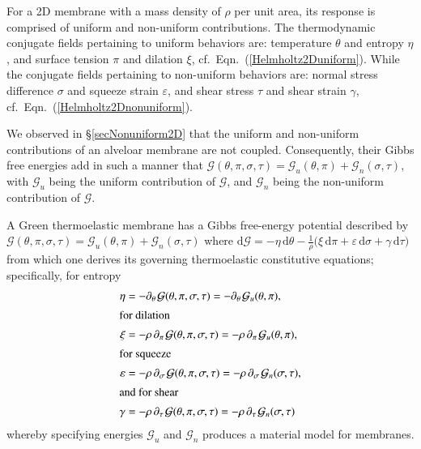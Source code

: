 For a 2D membrane with a mass density of $\rho$ per unit area, its response is comprised of uniform and non-uniform contributions.  The thermo\-dynamic conjugate fields pertaining to uniform behaviors are: temperature $\theta$ and entropy $\eta$, and surface tension $\pi$ and dilation $\xi$, cf.\ Eqn.~(\ref{Helmholtz2Duniform}).  While the conjugate fields pertaining to non-uniform behaviors are: normal stress difference $\sigma$ and squeeze strain $\varepsilon$, and shear stress $\tau$ and shear strain $\gamma$, cf.\ Eqn.~(\ref{Helmholtz2Dnonuniform}).

We observed in \S\ref{secNonuniform2D} that the uniform and non-uniform contributions of an alveloar membrane are not coupled.  Consequently, their Gibbs free energies add in such a manner that $\mathcal{G} (\theta , \pi , \sigma , \tau ) = \mathcal{G}_u (\theta , \pi ) + \mathcal{G}_n (\sigma , \tau)$, with $\mathcal{G}_u$ being the uniform contribution of $\mathcal{G}$, and $\mathcal{G}_n$ being the non-uniform contribution of $\mathcal{G}$.

A Green thermo\-elastic membrane has a Gibbs free-energy potential described by $\mathcal{G} ( \theta , \pi , \sigma , \tau ) = \mathcal{G}_u (\theta , \pi ) + \mathcal{G}_n (\sigma , \tau)$ where $\mathrm{d} \mathcal{G} = -\eta \, \mathrm{d} \theta - \tfrac{1}{\rho} \bigl( \xi \, \mathrm{d} \pi + \varepsilon \, \mathrm{d} \sigma + \gamma \, \mathrm{d} \tau \bigr)$ from which one derives its governing thermo\-elastic constitutive equations; specifically, for entropy
\begin{subequations}
    \label{membraneCEs}
    \begin{align}
    \eta & = - \partial_{\theta\,} \mathcal{G}
    ( \theta , \pi , \sigma , \tau ) = 
    - \partial_{\theta\,} \mathcal{G}_u
    ( \theta , \pi ) ,
    \label{membraneEntropy} \\
    \intertext{for dilation}
    \xi & = -\rho \, \partial_{\pi\,} \mathcal{G}
    ( \theta , \pi , \sigma , \tau ) = 
    -\rho \, \partial_{\pi\,} \mathcal{G}_u
    ( \theta , \pi )  ,
    \label{membraneDilation} \\
    \intertext{for squeeze}
    \varepsilon & = -\rho \, 
    \partial_{\sigma\,} \mathcal{G}
    ( \theta , \pi , \sigma , \tau ) = 
    -\rho \, \partial_{\sigma\,} \mathcal{G}_n
    ( \sigma , \tau ) ,
    \label{membraneSqueeze} \\
    \intertext{and for shear}
    \gamma & = - \rho \,
    \partial_{\tau\,} \mathcal{G}
    ( \theta , \pi , \sigma , \tau ) = 
    - \rho \, \partial_{\tau\,} \mathcal{G}_n
    ( \sigma , \tau ) 
    \label{membraneShear} 
    \end{align}
\end{subequations}
whereby specifying energies $\mathcal{G}_u$ and $\mathcal{G}_n$ produces a material model for membranes.

